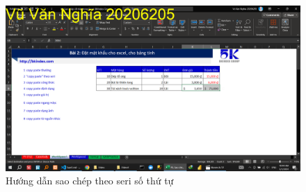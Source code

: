 \documentclass{article}
\begin{document}
\begin{figure}[H]
\centering
\includegraphics[scale = 0.15]{Video4/HuongDan/2.png}
\caption{Hướng dẫn sao chép theo seri số thứ tự}
\end{figure}




\end{document}

